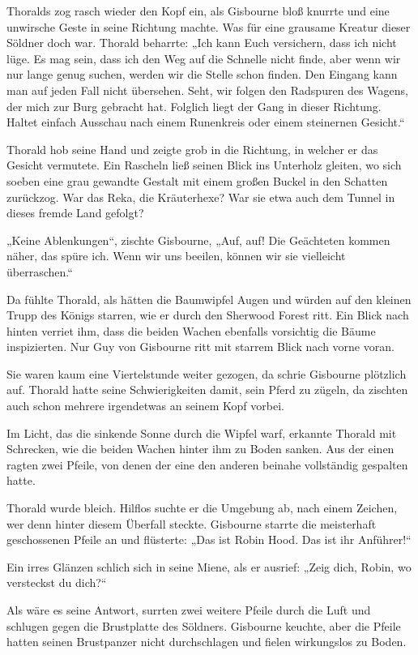 \documentclass[10pt, a4paper, oneside]{book}
\begin{document}
Thoralds zog rasch wieder den Kopf ein, als Gisbourne bloß knurrte und eine unwirsche Geste in seine Richtung machte. Was für eine grausame Kreatur dieser Söldner doch war. Thorald beharrte: „Ich kann Euch versichern, dass ich nicht lüge. Es mag sein, dass ich den Weg auf die Schnelle nicht finde, aber wenn wir nur lange genug suchen, werden wir die Stelle schon finden. Den Eingang kann man auf jeden Fall nicht übersehen. Seht, wir folgen den Radspuren des Wagens, der mich zur Burg gebracht hat. Folglich liegt der Gang in dieser Richtung. Haltet einfach Ausschau nach einem Runenkreis oder einem steinernen Gesicht.“

Thorald hob seine Hand und zeigte grob in die Richtung, in welcher er das Gesicht vermutete. Ein Rascheln ließ seinen Blick ins Unterholz gleiten, wo sich soeben eine grau gewandte Gestalt mit einem großen Buckel in den Schatten zurückzog. War das Reka, die Kräuterhexe? War sie etwa auch dem Tunnel in dieses fremde Land gefolgt?

„Keine Ablenkungen“, zischte Gisbourne, „Auf, auf! Die Geächteten kommen näher, das spüre ich. Wenn wir uns beeilen, können wir sie vielleicht überraschen.“

Da fühlte Thorald, als hätten die Baumwipfel Augen und würden auf den kleinen Trupp des Königs starren, wie er durch den Sherwood Forest ritt. Ein Blick nach hinten verriet ihm, dass die beiden Wachen ebenfalls vorsichtig die Bäume inspizierten. Nur Guy von Gisbourne ritt mit starrem Blick nach vorne voran.

Sie waren kaum eine Viertelstunde weiter gezogen, da schrie Gisbourne plötzlich auf. Thorald hatte seine Schwierigkeiten damit, sein Pferd zu zügeln, da zischten auch schon mehrere irgendetwas an seinem Kopf vorbei.

Im Licht, das die sinkende Sonne durch die Wipfel warf, erkannte Thorald mit Schrecken, wie die beiden Wachen hinter ihm zu Boden sanken. Aus der einen ragten zwei Pfeile, von denen der eine den anderen beinahe vollständig gespalten hatte.

Thorald wurde bleich. Hilflos suchte er die Umgebung ab, nach einem Zeichen, wer denn hinter diesem Überfall steckte. Gisbourne starrte die meisterhaft geschossenen Pfeile an und flüsterte: „Das ist Robin Hood. Das ist ihr Anführer!“

Ein irres Glänzen schlich sich in seine Miene, als er ausrief: „Zeig dich, Robin, wo versteckst du dich?“

Als wäre es seine Antwort, surrten zwei weitere Pfeile durch die Luft und schlugen gegen die Brustplatte des Söldners. Gisbourne keuchte, aber die Pfeile hatten seinen Brustpanzer nicht durchschlagen und fielen wirkungslos zu Boden.
\end{document}
